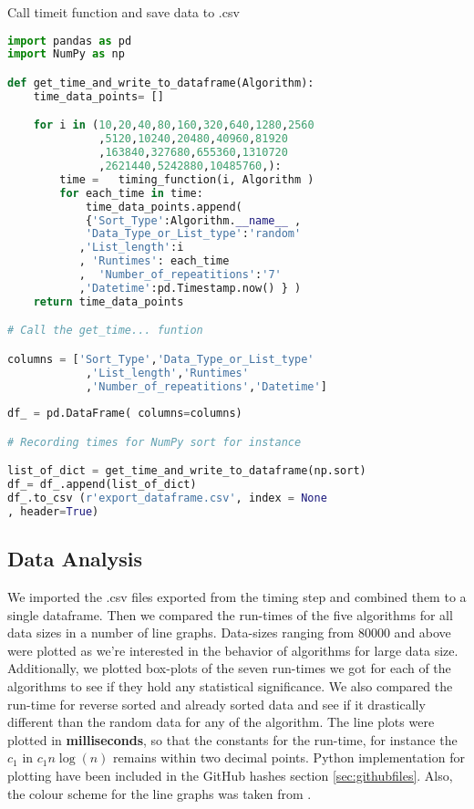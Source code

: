 \documentclass[sigconf, nonacm, natbib, screen, balance=False]{acmart}
\begin{document}
\begin{listing}
  \caption{Call timeit function and save data to .csv}
  \label{call time_it function}
\begin{lstlisting}[language=Python]
import pandas as pd
import NumPy as np

def get_time_and_write_to_dataframe(Algorithm):
    time_data_points= []

    for i in (10,20,40,80,160,320,640,1280,2560
              ,5120,10240,20480,40960,81920
              ,163840,327680,655360,1310720
              ,2621440,5242880,10485760,):
        time =   timing_function(i, Algorithm ) 
        for each_time in time:
            time_data_points.append( 
            {'Sort_Type':Algorithm.__name__ ,
            'Data_Type_or_List_type':'random'
           ,'List_length':i
           , 'Runtimes': each_time 
           ,  'Number_of_repeatitions':'7'
           ,'Datetime':pd.Timestamp.now() } )
    return time_data_points   

# Call the get_time... funtion 

columns = ['Sort_Type','Data_Type_or_List_type'
            ,'List_length','Runtimes'
            ,'Number_of_repeatitions','Datetime']
            
df_ = pd.DataFrame( columns=columns)

# Recording times for NumPy sort for instance

list_of_dict = get_time_and_write_to_dataframe(np.sort)
df_= df_.append(list_of_dict)
df_.to_csv (r'export_dataframe.csv', index = None
, header=True)
\end{lstlisting}
\end{listing}

\subsection{Data Analysis}\label{sec:analysis}
We imported the .csv files exported from the timing step and combined them to a single dataframe. Then we compared the run-times of the five algorithms for all data sizes in a number of line graphs. Data-sizes ranging from 80000 and above were plotted as we're interested in the behavior of algorithms for large data size.\newline
Additionally, we plotted box-plots of the seven run-times we got for each of the algorithms to see if they hold any statistical significance. We also compared the run-time for reverse sorted and already sorted data and see if it drastically different than the random data for any of the algorithm. The line plots were plotted in \textbf{milliseconds}, so that the constants for the run-time, for instance the $c_1$ in  $c_1n\log\left(n\right)$ remains within two decimal points.\newline
Python implementation for plotting have been included in the GitHub hashes section \ref{sec:githubfiles}. Also, the colour scheme for the line graphs was taken from \citet{colorcombo}.
\end{document}
